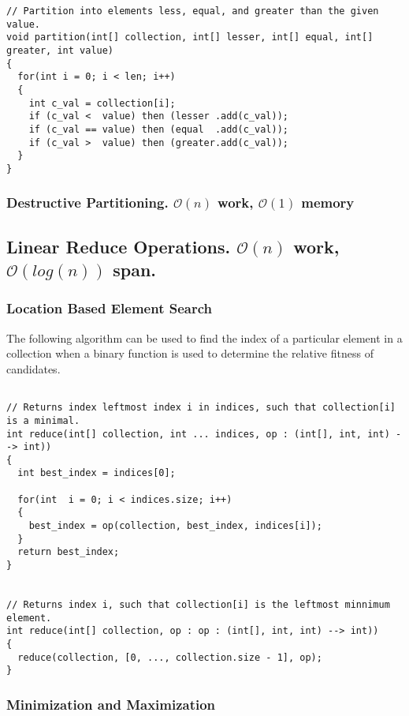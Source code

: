 \documentclass[12pt, letterpaper]{book}
\newcommand{\bigO}{\mathcal{O}}
\begin{document}
\begin{verbatim}
// Partition into elements less, equal, and greater than the given value.
void partition(int[] collection, int[] lesser, int[] equal, int[] greater, int value)
{
  for(int i = 0; i < len; i++)
  {
    int c_val = collection[i];
    if (c_val <  value) then (lesser .add(c_val));
    if (c_val == value) then (equal  .add(c_val));
    if (c_val >  value) then (greater.add(c_val));
  }
}
\end{verbatim}

		\subsubsection{Destructive Partitioning.  $\bigO(n)$ work, $\bigO(1)$ memory}

\newpage

		\subsection{Linear Reduce Operations. $\bigO(n)$ work, $\bigO(log(n))$ span.} \label{Minimum algorithms}

\subsubsection{Location Based Element Search}

The following algorithm can be used to find the index of a particular element in a collection when a binary function is used to determine the relative fitness of candidates.

\begin{verbatim}

// Returns index leftmost index i in indices, such that collection[i] is a minimal.
int reduce(int[] collection, int ... indices, op : (int[], int, int) --> int))
{
  int best_index = indices[0];

  for(int  i = 0; i < indices.size; i++)
  {
    best_index = op(collection, best_index, indices[i]);
  }
  return best_index;
}


// Returns index i, such that collection[i] is the leftmost minnimum element.
int reduce(int[] collection, op : op : (int[], int, int) --> int))
{
  reduce(collection, [0, ..., collection.size - 1], op);
}
\end{verbatim}

\subsubsection{Minimization and Maximization}
\end{document}
